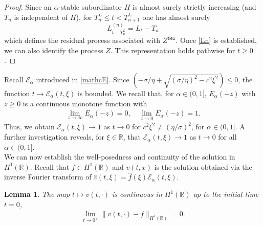 \documentclass[10pt,a4paper]{article}
\numberwithin{equation}{section}
\theoremstyle{plain}
\newtheorem{lemma}{Lemma}
\theoremstyle{remark}
\begin{document}
\begin{proof}
Since an $\alpha$-stable subordinator $H$ is almost surely strictly increasing (and $T_n$ is independent of $H$), for $T_n^L\le t<T_{n+1}^L$ one has almost surely
	\begin{equation}
		L_{t-T_n^L}^{(n)}=L_t-T_n
		\label{Ln}
	\end{equation}
 which defines the residual process associated with $Z^\mathtt{tel}$. Once \eqref{Ln} is established, we can also identify the process $Z$. This representation holds pathwise for $t \geq 0$. 
\end{proof}



Recall $\mathcal{E}_\alpha$ introduced in \eqref{mathcE}. Since $(-\sigma/\eta + \sqrt{(\sigma/\eta)^2-c^2 \xi^2}) \leq 0$, the function $t \to \mathcal{E}_\alpha(t, \xi)$ is bounded. We recall that, for $\alpha \in (0,1]$, $E_\alpha(-z)$ with $z\geq 0$ is a continuous monotone function with 
\begin{align*}
\lim_{z\to \infty} E_\alpha(-z)=0, \quad \lim_{z \to 0}E_\alpha(-z)=1.
\end{align*}
Thus, we obtain $\mathcal{E}_\alpha(t, \xi) \to 1$ as $t \to 0$ for $c^2\xi^2 \neq (\eta/\sigma)^2$, for $\alpha \in (0,1]$. A further investigation reveals, for $\xi \in \mathbb{R}$, that $\mathcal{E}_\alpha(t, \xi) \to 1$ as $t \to 0$ for all $\alpha \in (0,1]$. \\



We can now establish the well-posedness and continuity of the solution in $H^1(\mathbb{R})$. Recall that $f \in H^1(\mathbb{R})$ and $v(t,x)$ is the solution obtained via the inverse Fourier transform of $\hat{v}(t,\xi) = \hat{f}(\xi)\mathcal{E}_\alpha(t,\xi)$.


\begin{lemma}
The map $t \mapsto v(t, \cdot)$ is continuous in $H^1(\mathbb{R})$ up to the initial time $t=0$, 
\begin{align*}
\lim_{t \to 0^+} \|v(t, \cdot) - f\|_{H^1(\mathbb{R})} = 0.
\end{align*}
\label{lemma:contZERO}
\end{lemma}
\end{document}

